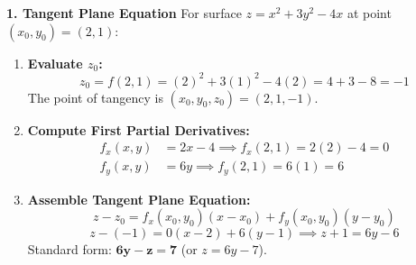 \textbf{1. Tangent Plane Equation}
For surface $z = x^2 + 3y^2 - 4x$ at point $(x_0, y_0) = (2, 1)$:
\begin{enumerate}
    \item \textbf{Evaluate $z_0$:}
    \begin{equation*}
    z_0 = f(2, 1) = (2)^2 + 3(1)^2 - 4(2) = 4 + 3 - 8 = -1
    \end{equation*}
    The point of tangency is $(x_0, y_0, z_0) = (2, 1, -1)$.
    \item \textbf{Compute First Partial Derivatives:}
    \begin{align*}
    f_x(x, y) &= 2x - 4 \implies f_x(2, 1) = 2(2) - 4 = 0 \\
    f_y(x, y) &= 6y \implies f_y(2, 1) = 6(1) = 6
    \end{align*}
    \item \textbf{Assemble Tangent Plane Equation:}
    \begin{equation*}
    z - z_0 = f_x(x_0, y_0)(x - x_0) + f_y(x_0, y_0)(y - y_0)
    \end{equation*}
    \begin{equation*}
    z - (-1) = 0(x - 2) + 6(y - 1) \implies z + 1 = 6y - 6
    \end{equation*}
    Standard form: $\mathbf{6y - z = 7}$ (or $z = 6y - 7$).
\end{enumerate}

